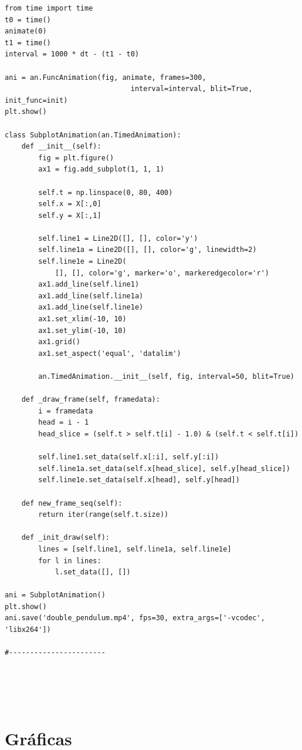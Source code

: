 \documentclass[12pt]{article}
\begin{document}
\begin{verbatim}
from time import time
t0 = time()
animate(0)
t1 = time()
interval = 1000 * dt - (t1 - t0)

ani = an.FuncAnimation(fig, animate, frames=300,
                              interval=interval, blit=True, init_func=init)
plt.show()

class SubplotAnimation(an.TimedAnimation):
    def __init__(self):
        fig = plt.figure()
        ax1 = fig.add_subplot(1, 1, 1)
       
        self.t = np.linspace(0, 80, 400)
        self.x = X[:,0]
        self.y = X[:,1]

        self.line1 = Line2D([], [], color='y')
        self.line1a = Line2D([], [], color='g', linewidth=2)
        self.line1e = Line2D(
            [], [], color='g', marker='o', markeredgecolor='r')
        ax1.add_line(self.line1)
        ax1.add_line(self.line1a)
        ax1.add_line(self.line1e)
        ax1.set_xlim(-10, 10)
        ax1.set_ylim(-10, 10)
        ax1.grid()
        ax1.set_aspect('equal', 'datalim')

        an.TimedAnimation.__init__(self, fig, interval=50, blit=True)

    def _draw_frame(self, framedata):
        i = framedata
        head = i - 1
        head_slice = (self.t > self.t[i] - 1.0) & (self.t < self.t[i])

        self.line1.set_data(self.x[:i], self.y[:i])
        self.line1a.set_data(self.x[head_slice], self.y[head_slice])
        self.line1e.set_data(self.x[head], self.y[head])

    def new_frame_seq(self):
        return iter(range(self.t.size))

    def _init_draw(self):
        lines = [self.line1, self.line1a, self.line1e]
        for l in lines:
            l.set_data([], [])

ani = SubplotAnimation()
plt.show()
ani.save('double_pendulum.mp4', fps=30, extra_args=['-vcodec', 'libx264'])

#-----------------------





\end{verbatim}

\section{Gráficas}
\end{document}
